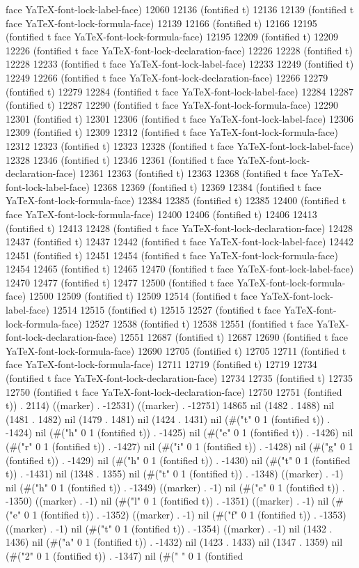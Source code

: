face YaTeX-font-lock-label-face) 12060 12136 (fontified t) 12136 12139 (fontified t face YaTeX-font-lock-formula-face) 12139 12166 (fontified t) 12166 12195 (fontified t face YaTeX-font-lock-formula-face) 12195 12209 (fontified t) 12209 12226 (fontified t face YaTeX-font-lock-declaration-face) 12226 12228 (fontified t) 12228 12233 (fontified t face YaTeX-font-lock-label-face) 12233 12249 (fontified t) 12249 12266 (fontified t face YaTeX-font-lock-declaration-face) 12266 12279 (fontified t) 12279 12284 (fontified t face YaTeX-font-lock-label-face) 12284 12287 (fontified t) 12287 12290 (fontified t face YaTeX-font-lock-formula-face) 12290 12301 (fontified t) 12301 12306 (fontified t face YaTeX-font-lock-label-face) 12306 12309 (fontified t) 12309 12312 (fontified t face YaTeX-font-lock-formula-face) 12312 12323 (fontified t) 12323 12328 (fontified t face YaTeX-font-lock-label-face) 12328 12346 (fontified t) 12346 12361 (fontified t face YaTeX-font-lock-declaration-face) 12361 12363 (fontified t) 12363 12368 (fontified t face YaTeX-font-lock-label-face) 12368 12369 (fontified t) 12369 12384 (fontified t face YaTeX-font-lock-formula-face) 12384 12385 (fontified t) 12385 12400 (fontified t face YaTeX-font-lock-formula-face) 12400 12406 (fontified t) 12406 12413 (fontified t) 12413 12428 (fontified t face YaTeX-font-lock-declaration-face) 12428 12437 (fontified t) 12437 12442 (fontified t face YaTeX-font-lock-label-face) 12442 12451 (fontified t) 12451 12454 (fontified t face YaTeX-font-lock-formula-face) 12454 12465 (fontified t) 12465 12470 (fontified t face YaTeX-font-lock-label-face) 12470 12477 (fontified t) 12477 12500 (fontified t face YaTeX-font-lock-formula-face) 12500 12509 (fontified t) 12509 12514 (fontified t face YaTeX-font-lock-label-face) 12514 12515 (fontified t) 12515 12527 (fontified t face YaTeX-font-lock-formula-face) 12527 12538 (fontified t) 12538 12551 (fontified t face YaTeX-font-lock-declaration-face) 12551 12687 (fontified t) 12687 12690 (fontified t face YaTeX-font-lock-formula-face) 12690 12705 (fontified t) 12705 12711 (fontified t face YaTeX-font-lock-formula-face) 12711 12719 (fontified t) 12719 12734 (fontified t face YaTeX-font-lock-declaration-face) 12734 12735 (fontified t) 12735 12750 (fontified t face YaTeX-font-lock-declaration-face) 12750 12751 (fontified t)) . 2114) ((marker) . -12531) ((marker) . -12751) 14865 nil (1482 . 1488) nil (1481 . 1482) nil (1479 . 1481) nil (1424 . 1431) nil (#("t" 0 1 (fontified t)) . -1424) nil (#("h" 0 1 (fontified t)) . -1425) nil (#("e" 0 1 (fontified t)) . -1426) nil (#("r" 0 1 (fontified t)) . -1427) nil (#("i" 0 1 (fontified t)) . -1428) nil (#("g" 0 1 (fontified t)) . -1429) nil (#("h" 0 1 (fontified t)) . -1430) nil (#("t" 0 1 (fontified t)) . -1431) nil (1348 . 1355) nil (#("t" 0 1 (fontified t)) . -1348) ((marker) . -1) nil (#("h" 0 1 (fontified t)) . -1349) ((marker) . -1) nil (#("e" 0 1 (fontified t)) . -1350) ((marker) . -1) nil (#("l" 0 1 (fontified t)) . -1351) ((marker) . -1) nil (#("e" 0 1 (fontified t)) . -1352) ((marker) . -1) nil (#("f" 0 1 (fontified t)) . -1353) ((marker) . -1) nil (#("t" 0 1 (fontified t)) . -1354) ((marker) . -1) nil (1432 . 1436) nil (#("a" 0 1 (fontified t)) . -1432) nil (1423 . 1433) nil (1347 . 1359) nil (#("2" 0 1 (fontified t)) . -1347) nil (#(" " 0 1 (fontified 